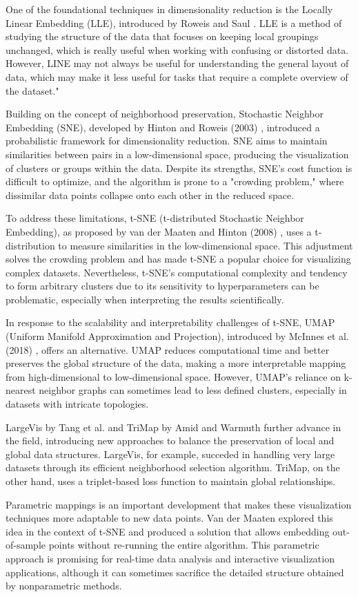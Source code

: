 One of the foundational techniques in dimensionality reduction is the Locally Linear Embedding (LLE), introduced by Roweis and Saul \cite{roweis2000nonlinear}. LLE is a method of studying the structure of the data that focuses on keeping local groupings unchanged, which is really useful when working with confusing or distorted data. However, LINE may not always be useful for understanding the general layout of data, which may make it less useful for tasks that require a complete overview of the dataset."

Building on the concept of neighborhood preservation, Stochastic Neighbor Embedding (SNE), developed by Hinton and Roweis (2003) \cite{hinton2002stochastic}, introduced a probabilistic framework for dimensionality reduction. SNE aims to maintain similarities between pairs in a low-dimensional space, producing the visualization of clusters or groups within the data. Despite its strengths, SNE's cost function is difficult to optimize, and the algorithm is prone to a "crowding problem," where dissimilar data points collapse onto each other in the reduced space.

To address these limitations, t-SNE (t-distributed Stochastic Neighbor Embedding), as proposed by van der Maaten and Hinton (2008) \cite {van2008visualizing}, uses a t-distribution to measure similarities in the low-dimensional space. This adjustment solves the crowding problem and has made t-SNE a popular choice for visualizing complex datasets. Nevertheless, t-SNE's computational complexity and tendency to form arbitrary clusters due to its sensitivity to hyperparameters can be problematic, especially when interpreting the results scientifically.

In response to the scalability and interpretability challenges of t-SNE, UMAP (Uniform Manifold Approximation and Projection), introduced by McInnes et al. (2018) \cite{mcinnes2018umap}, offers an alternative. UMAP reduces computational time and better preserves the global structure of the data, making a more interpretable mapping from high-dimensional to low-dimensional space. However, UMAP's reliance on k-nearest neighbor graphs can sometimes lead to less defined clusters, especially in datasets with intricate topologies.

LargeVis by Tang et al. \cite{tang2016visualizing} and TriMap by Amid and Warmuth \cite {amid2019trimap} further advance in the field, introducing new approaches to balance the preservation of local and global data structures. LargeVis, for example, succeded in handling very large datasets through its efficient neighborhood selection algorithm. TriMap, on the other hand, uses a triplet-based loss function to maintain global relationships.

Parametric mappings is an important development that makes these visualization techniques more adaptable to new data points. Van der Maaten explored this idea \cite{van2009learning} in the context of t-SNE and produced a solution that allows embedding out-of-sample points without re-running the entire algorithm. This parametric approach is promising for real-time data analysis and interactive visualization applications, although it can sometimes sacrifice the detailed structure obtained by nonparametric methods.